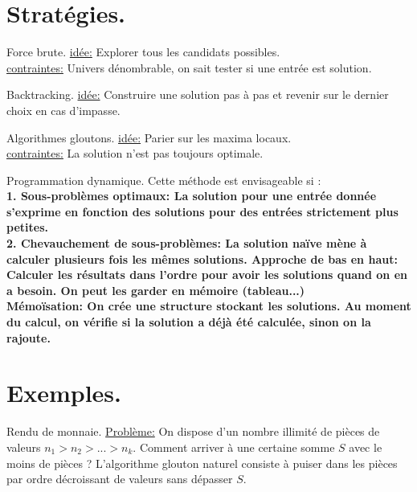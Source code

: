 \documentclass[french, 11pt]{article}
\begin{document}


\section{Stratégies.}

\begin{defi}{Force brute.}{}
    \underline{idée:} Explorer tous les candidats possibles.\\
    \underline{contraintes:} Univers dénombrable, on sait tester si une entrée est solution.
\end{defi}

\begin{defi}{Backtracking.}{}
    \underline{idée:} Construire une solution pas à pas et revenir sur le dernier choix en cas d'impasse.
\end{defi}

\begin{defi}{Algorithmes gloutons.}{}
    \underline{idée:} Parier sur les maxima locaux.\\
    \underline{contraintes:} La solution n'est pas toujours optimale.
\end{defi}

\begin{defi}{Programmation dynamique.}{}
    Cette méthode est envisageable si :\\
    \bf{1. Sous-problèmes optimaux:} La solution pour une entrée donnée s'exprime en fonction des solutions pour des entrées strictement plus petites.\\
    \bf{2. Chevauchement de sous-problèmes:} La solution naïve mène à calculer plusieurs fois les mêmes solutions.\n
    \bf{Approche de bas en haut:} Calculer les résultats dans l'ordre pour avoir les solutions quand on en a besoin. On peut les garder en mémoire (tableau...)\\
    \bf{Mémoïsation:} On crée une structure stockant les solutions. Au moment du calcul, on vérifie si la solution a déjà été calculée, sinon on la rajoute.
\end{defi}

\section{Exemples.}

\begin{ex}{Rendu de monnaie.}{}
    \underline{Problème:} On dispose d'un nombre illimité de pièces de valeurs $n_1>n_2>...>n_k$. Comment arriver à une certaine somme $S$ avec le moins de pièces ?\n
    L'algorithme glouton naturel consiste à puiser dans les pièces par ordre décroissant de valeurs sans dépasser $S$.
\end{ex}
\end{document}

